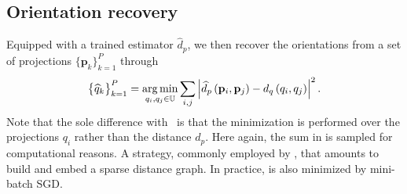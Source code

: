 
\subsection{Orientation recovery}\label{sec:method:orientation-recovery}

Equipped with a trained estimator $\widehat{d}_p$, we then recover the orientations from a set of projections $\big\{ \mathbf{p}_k \big\}_{k=1}^P$ through 
\begin{equation}
    \big\{ \widehat{q}_k \big\}_{k=1}^P = \operatorname*{arg\,min}_{q_i, q_j \in \mathbb{U}} \sum_{i,j} \left| \widehat{d}_p \left( \mathbf{p}_i, \mathbf{p}_j \right) - d_q\left(q_i,q_j\right) \right|^2.
    \label{eqn:orientation-recovery}
\end{equation}
Note that the sole difference with~ is that the minimization is performed over the projections $q_i$ rather than the distance $d_p$. Here again, the sum in  is sampled for computational reasons.
A strategy, commonly employed by , that amounts to build and embed a sparse distance graph. 
In practice,  is also minimized by mini-batch SGD.

